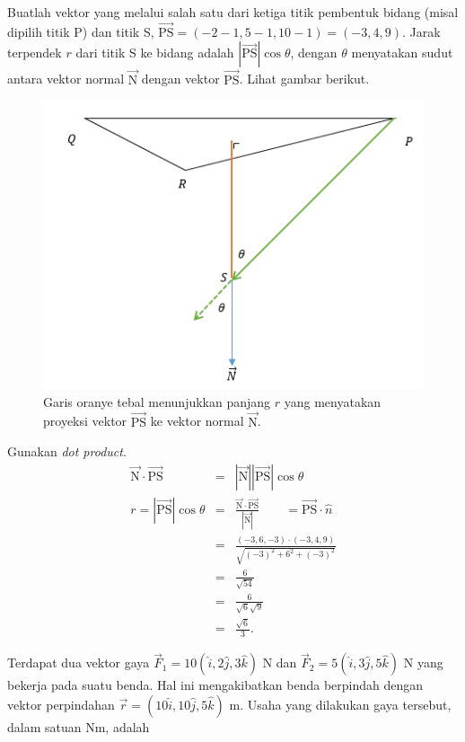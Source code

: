 \documentclass[11pt,fleqn]{exam}
\begin{document}
\begin{questions}
Buatlah vektor yang melalui salah satu dari ketiga titik pembentuk bidang (misal dipilih titik P) dan titik S, $\overrightarrow{\text{PS}}=(-2-1,5-1,10-1)=(-3,4,9)$. Jarak terpendek $r$ dari titik S ke bidang adalah $|\overrightarrow{\text{PS}}|\cos \theta$, dengan $\theta$ menyatakan sudut antara vektor normal $\overrightarrow{\text{N}}$ dengan vektor $\overrightarrow{\text{PS}}$. Lihat gambar berikut.
\begin{figure}[h!]
\centering
\includegraphics[scale=0.8]{pqrcross.PNG}
\caption*{Garis oranye tebal menunjukkan panjang $r$ yang menyatakan proyeksi vektor $\overrightarrow{\text{PS}}$ ke vektor normal $\overrightarrow{\text{N}}$.}
\end{figure}

Gunakan \textit{dot product}.
\begin{eqnarray*}
\overrightarrow{\text{N}}\cdot\overrightarrow{\text{PS}} &=& |\overrightarrow{\text{N}}||\overrightarrow{\text{PS}}|\cos \theta\\
r = |\overrightarrow{\text{PS}}|\cos\theta &=& \frac{\overrightarrow{\text{N}}\cdot\overrightarrow{\text{PS}}}{|\overrightarrow{\text{N}}|} \qquad = \overrightarrow{\text{PS}} \cdot \hat{n} \\
&=&\frac{(-3,6,-3)\cdot(-3,4,9)}{\sqrt{(-3)^2+6^2+(-3)^2}}\\
&=&\frac{6}{\sqrt{54}}\\
&=&\frac{6}{\sqrt{6}\sqrt{9}}\\
&=&\frac{\sqrt{6}}{3}.
\end{eqnarray*}

\question Terdapat dua vektor gaya $\overrightarrow{F}_{1} = 10(\hat{i}, 2\hat{j}, 3\hat{k})$ N dan $\overrightarrow{F}_{2} = 5(\hat{i}, 3\hat{j}, 5\hat{k})$ N yang bekerja pada suatu benda. Hal ini mengakibatkan benda berpindah dengan vektor perpindahan $\overrightarrow{r} = (10\hat{i}, 10\hat{j}, 5\hat{k})$ m. Usaha yang dilakukan gaya tersebut, dalam satuan Nm, adalah
\begin{choices}
\end{choices}


\end{questions}
\end{document}

